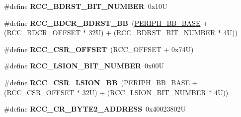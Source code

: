 \begin{DoxyCompactItemize}
\item 
\mbox{\label{group___r_c_c___bit_address___alias_region_ga68b0f7a13e733453c7efcd66a6ee251d}} 
\#define {\bfseries R\+C\+C\+\_\+\+B\+D\+R\+S\+T\+\_\+\+B\+I\+T\+\_\+\+N\+U\+M\+B\+ER}~0x10U
\item 
\mbox{\label{group___r_c_c___bit_address___alias_region_ga5e5805d3c5b9ad3ebc13e030e5fdd86c}} 
\#define {\bfseries R\+C\+C\+\_\+\+B\+D\+C\+R\+\_\+\+B\+D\+R\+S\+T\+\_\+\+BB}~(\hyperlink{group___peripheral__memory__map_gaed7efc100877000845c236ccdc9e144a}{P\+E\+R\+I\+P\+H\+\_\+\+B\+B\+\_\+\+B\+A\+SE} + (R\+C\+C\+\_\+\+B\+D\+C\+R\+\_\+\+O\+F\+F\+S\+ET $\ast$ 32\+U) + (\+R\+C\+C\+\_\+\+B\+D\+R\+S\+T\+\_\+\+B\+I\+T\+\_\+\+N\+U\+M\+B\+E\+R $\ast$ 4\+U))
\item 
\mbox{\label{group___r_c_c___bit_address___alias_region_ga63141585a221eed1fd009eb80e406619}} 
\#define {\bfseries R\+C\+C\+\_\+\+C\+S\+R\+\_\+\+O\+F\+F\+S\+ET}~(R\+C\+C\+\_\+\+O\+F\+F\+S\+ET + 0x74\+U)
\item 
\mbox{\label{group___r_c_c___bit_address___alias_region_ga577ffeb20561aa8395fe5327807b5709}} 
\#define {\bfseries R\+C\+C\+\_\+\+L\+S\+I\+O\+N\+\_\+\+B\+I\+T\+\_\+\+N\+U\+M\+B\+ER}~0x00U
\item 
\mbox{\label{group___r_c_c___bit_address___alias_region_gac34a2d63deae3efc65e66f8fb3c26dae}} 
\#define {\bfseries R\+C\+C\+\_\+\+C\+S\+R\+\_\+\+L\+S\+I\+O\+N\+\_\+\+BB}~(\hyperlink{group___peripheral__memory__map_gaed7efc100877000845c236ccdc9e144a}{P\+E\+R\+I\+P\+H\+\_\+\+B\+B\+\_\+\+B\+A\+SE} + (R\+C\+C\+\_\+\+C\+S\+R\+\_\+\+O\+F\+F\+S\+ET $\ast$ 32\+U) + (\+R\+C\+C\+\_\+\+L\+S\+I\+O\+N\+\_\+\+B\+I\+T\+\_\+\+N\+U\+M\+B\+E\+R $\ast$ 4\+U))
\item 
\mbox{\label{group___r_c_c___bit_address___alias_region_ga1da336203f39dd57462e7f331271f699}} 
\#define {\bfseries R\+C\+C\+\_\+\+C\+R\+\_\+\+B\+Y\+T\+E2\+\_\+\+A\+D\+D\+R\+E\+SS}~0x40023802U
\item 
\mbox{\label{group___r_c_c___bit_address___alias_region_ga97f80d22ba3506a43accbeb9ceb31f51}} 

\end{DoxyCompactItemize}
